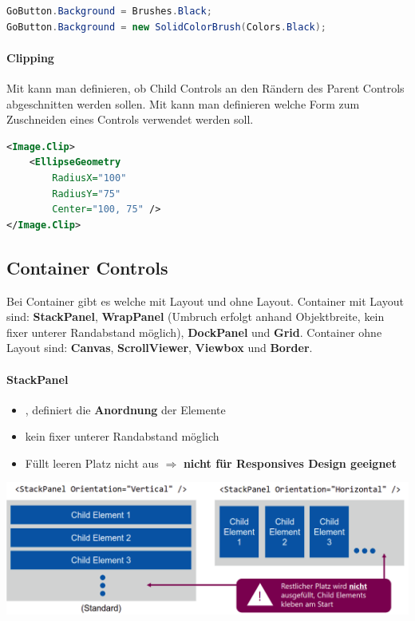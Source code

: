 \begin{lstlisting}[language=java]
GoButton.Background = Brushes.Black;
GoButton.Background = new SolidColorBrush(Colors.Black);
\end{lstlisting}

\paragraph{Clipping} Mit  kann man definieren, ob Child Controls an den Rändern des Parent Controls abgeschnitten werden sollen. Mit  kann man definieren welche Form zum Zuschneiden eines Controls verwendet werden soll.
\begin{lstlisting}[language=xml]
<Image.Clip>
    <EllipseGeometry
        RadiusX="100"
        RadiusY="75"
        Center="100, 75" />
</Image.Clip>
\end{lstlisting}
\subsection{Container Controls} Bei Container gibt es welche mit Layout und ohne Layout. Container mit Layout sind: \textbf{StackPanel}, \textbf{WrapPanel} (Umbruch erfolgt anhand Objektbreite, kein fixer unterer Randabstand möglich), \textbf{DockPanel} und \textbf{Grid}. Container ohne Layout sind: \textbf{Canvas}, \textbf{ScrollViewer}, \textbf{Viewbox} und \textbf{Border}.

\paragraph{StackPanel}
\begin{itemize}
    \item {}, definiert die \textbf{Anordnung} der Elemente
    \item kein fixer unterer Randabstand möglich
    \item Füllt leeren Platz nicht aus $\Rightarrow$ \textbf{nicht für Responsives Design geeignet}
\end{itemize}

\includegraphics[scale=0.18]{img/stackpanel-overview.png}

